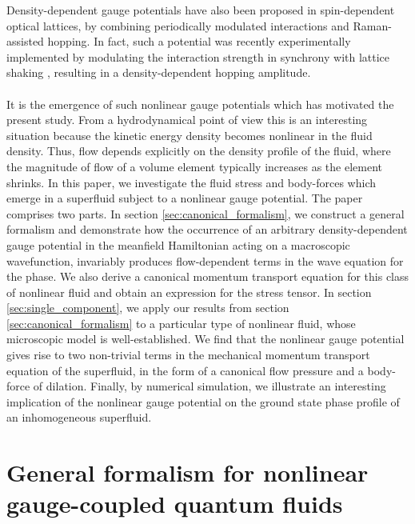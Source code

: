 \documentclass[twocolumn, nofootinbib, nobibnotes, amsmath,amssymb,aps, pra, floatfix]{revtex4-1}
\begin{document}
Density-dependent gauge potentials have also been proposed \cite{greschner2014density} in spin-dependent optical lattices, by combining periodically modulated interactions and Raman-assisted hopping.
In fact, such a potential was recently experimentally implemented by modulating the interaction strength in synchrony with lattice shaking \cite{PhysRevLett.121.030402}, resulting in a density-dependent hopping amplitude.\\\\
It is the emergence of such nonlinear gauge potentials which has motivated the present study.
From a hydrodynamical point of view this is an interesting situation because the kinetic energy density becomes nonlinear in the fluid density.
Thus, flow depends explicitly on the density profile of the fluid, where the magnitude of flow of a volume element typically increases as the element shrinks.
In this paper, we investigate the fluid stress and body-forces which emerge in a superfluid subject to a nonlinear gauge potential. 
The paper comprises two parts.
In section \ref{sec:canonical_formalism}, we construct a general formalism and demonstrate how the occurrence of an arbitrary density-dependent gauge potential in the meanfield Hamiltonian acting on a macroscopic wavefunction, invariably produces flow-dependent terms in the wave equation for the phase. 
We also derive a canonical momentum transport equation for this class of nonlinear fluid and obtain an expression for the stress tensor.
In section \ref{sec:single_component}, we apply our results from section \ref{sec:canonical_formalism} to a particular type of nonlinear fluid, whose microscopic model is well-established.
We find that the nonlinear gauge potential gives rise to two non-trivial terms in the mechanical momentum transport equation of the superfluid, in the form of a canonical flow pressure and a body-force of dilation.
Finally, by numerical simulation, we illustrate an interesting implication of the nonlinear gauge potential on the ground state phase profile of an inhomogeneous superfluid.
\section{\label{sec:canonical_formalism}General formalism for nonlinear gauge-coupled quantum fluids}
\end{document}
